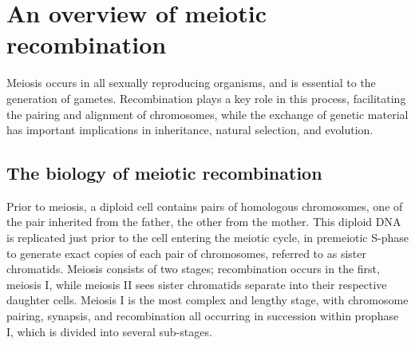
\section{An overview of meiotic recombination}

Meiosis occurs in all sexually reproducing organisms, and is essential to the generation of gametes.
Recombination plays a key role in this process, facilitating the pairing and alignment of chromosomes, while the exchange of genetic material has important implications in inheritance, natural selection, and evolution.



\subsection{The biology of meiotic recombination}

Prior to meiosis, a diploid cell contains pairs of homologous chromosomes, one of the pair inherited from the father, the other from the mother.
This diploid DNA is replicated just prior to the cell entering the meiotic cycle, in premeiotic S-phase\cite{Bell2002} to generate exact copies of each pair of chromosomes, referred to as sister chromatids.
Meiosis consists of two stages; recombination occurs in the first, meiosis I, while meiosis II sees sister chromatids separate into their respective daughter cells.
Meiosis I is the most complex and lengthy stage, with chromosome pairing, synapsis, and recombination all occurring in succession within prophase I, which is  divided into several sub-stages.

